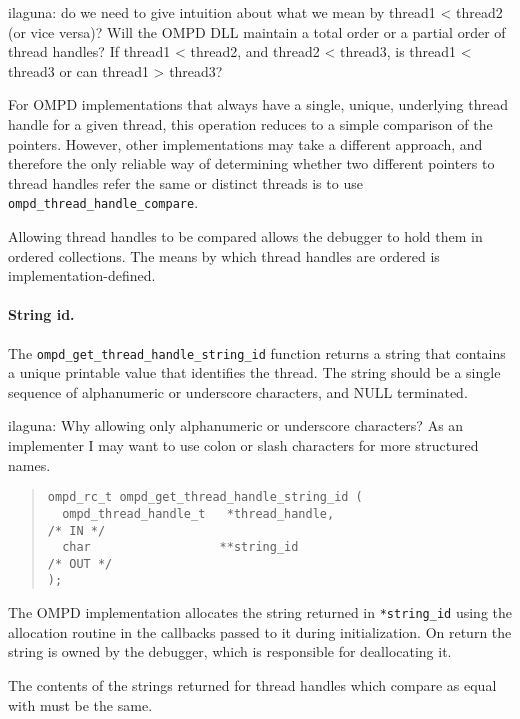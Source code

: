 \begin{notes}
ilaguna: do we need to give intuition about what we mean by thread1 < thread2 
(or vice versa)? Will the OMPD DLL maintain a total order or a partial order of 
thread handles? If thread1 < thread2, and thread2 < thread3, is thread1 < 
thread3 or can thread1 > thread3?
\end{notes}

For OMPD implementations that always have a single, unique, underlying
thread handle for a given thread, this operation reduces to a simple
comparison of the pointers.
However, other implementations may take a different approach,
and therefore the only reliable way of determining whether two different
pointers to thread handles refer the same or distinct threads is to use
\texttt{ompd\_thread\_handle\_compare}.

Allowing thread handles to be compared allows the debugger to hold
them in ordered collections.
The means by which thread handles are ordered is implementation-defined.

\paragraph{String id.}
The \texttt{ompd\_get\_thread\_handle\_string\_id} function returns a string
that contains a unique printable value that identifies the thread.
The string should be a single sequence of alphanumeric or underscore
characters, and NULL terminated.
\begin{notes}
ilaguna: Why allowing only alphanumeric or underscore characters? As an 
implementer I may want to use colon or slash characters for more structured 
names.
\end{notes}
\begin{quote}
\begin{lstlisting}
ompd_rc_t ompd_get_thread_handle_string_id (
  ompd_thread_handle_t   *thread_handle,                            /* IN */
  char                  **string_id                                /* OUT */
);
\end{lstlisting}
\end{quote}

The OMPD implementation allocates the string returned in \texttt{*string\_id}
using the allocation routine in the callbacks passed to it
during initialization.
On return the string is owned by the debugger, which is responsible
for deallocating it.

The contents of the strings returned for thread handles
which compare as equal with
must be the same.

